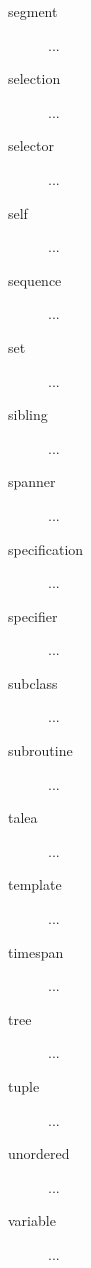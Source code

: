 \begin{description}
\item[segment] ...

\item[selection] ...

\item[selector] ...

\item[self] ...

\item[sequence] ...

\item[set] ...

\item[sibling] ...

\item[spanner] ...

\item[specification] ...

\item[specifier] ...

\item[subclass] ...

\item[subroutine] ...

\item[talea] ...

\item[template] ...

\item[timespan] ...

\item[tree] ...

\item[tuple] ...

\item[unordered] ...

\item[variable] ...

\end{description}